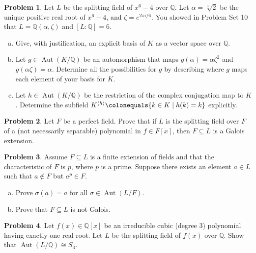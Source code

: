 \documentclass[11pt]{article}
\DeclareMathOperator{\Aut}{Aut}
\newcommand{\Q}{\mathbb{Q}}
\theoremstyle{definition}
\newtheorem{problem}{Problem}
\begin{document}
\begin{problem}
Let $L$ be the splitting field of $x^6-4$ over $\Q$. Let $\alpha = \sqrt[3]{2}$ be the unique positive real root of $x^6-4$, and $\zeta = e^{2\pi i/6}$. You showed in Problem Set 10 that $L=\Q(\alpha,\zeta)$ and $[L:\Q]=6$.

\begin{enumerate}[a)]
\item Give, with justification, an explicit basis of $K$ as a vector space over $\Q$. 

\item Let $g \in \Aut(K/\Q)$ be an automorphism that maps $g(\alpha)= \alpha\zeta^2$ and $g(\alpha\zeta)=\alpha$. Determine all the possibilities for $g$ by describing where $g$ maps each element of your basis for $K$. 

\item Let $h \in \Aut(K/\Q)$ be the restriction of the complex conjugation map to $K$. Determine the subfield $K^{\langle h \rangle} \colonequals \{k\in K \mid h(k)=k\}$ explicitly. 
\end{enumerate}
\end{problem}


\begin{problem}
Let $F$ be a perfect field. Prove that if $L$ is the splitting field over $F$ of a (not necessarily separable) polynomial in $f \in F[x]$, then $F \subseteq L$ is a Galois extension.
\end{problem}




\begin{problem}
Assume $F \subseteq L$ is a finite extension of fields and that the characteristic of $F$ is $p$, where $p$ is a prime. Suppose there exists an element $a \in L$ such that $a \notin F$ but $a^p \in F$.
\begin{enumerate}[a)]
\item Prove $\sigma(a) = a$ for all $\sigma \in \Aut(L/F)$.
\item Prove that $F \subseteq L$ is not Galois.
\end{enumerate}
\end{problem}  



\begin{problem}
	Let $f(x) \in \Q[x]$ be an irreducible cubic (degree $3$) polynomial having exactly one real root. 
Let $L$ be the splitting field of $f(x)$ over $\Q$. Show that $\Aut(L/\Q) \cong S_3$.
\end{problem}
\end{document}
